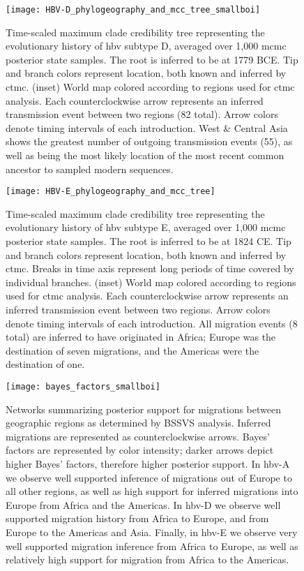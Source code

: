 \begin{figure}[ht]
  \centering
  \medskip
  \texttt{[image: HBV-D\_phylogeography\_and\_mcc\_tree\_smallboi]}
  \caption[HBV-D Phylogeography]{Time-scaled maximum clade credibility tree representing the evolutionary history of \gls{hbv} subtype D, averaged over 1,000 \gls{mcmc} posterior state samples. The root is inferred to be at 1779 BCE. Tip and branch colors represent location, both known and inferred by \gls{ctmc}. (inset) World map colored according to regions used for \gls{ctmc} analysis. Each counterclockwise arrow represents an inferred transmission event between two regions (82 total). Arrow colors denote timing intervals of each introduction. West \& Central Asia shows the greatest number of outgoing transmission events (55), as well as being the most likely location of the most recent common ancestor to sampled modern sequences.}
  \label{fig:HBV-D_phylogeo}
\end{figure}

\begin{figure}[ht]
  \centering
  \medskip
  \texttt{[image: HBV-E\_phylogeography\_and\_mcc\_tree]}
  \caption[HBV-E Phylogeography]{Time-scaled maximum clade credibility tree representing the evolutionary history of \gls{hbv} subtype E, averaged over 1,000 \gls{mcmc} posterior state samples. The root is inferred to be at 1824 CE. Tip and branch colors represent location, both known and inferred by \gls{ctmc}. Breaks in time axis represent long periods of time covered by individual branches. (inset) World map colored according to regions used for \gls{ctmc} analysis. Each counterclockwise arrow represents an inferred transmission event between two regions. Arrow colors denote timing intervals of each introduction. All migration events (8 total) are inferred to have originated in Africa; Europe was the destination of seven migrations, and the Americas were the destination of one.}
  \label{fig:HBV-E_phylogeo}
\end{figure}

\begin{figure}[ht]
  \centering
  \medskip
  \texttt{[image: bayes\_factors\_smallboi]}
  \caption[Bayes' factors of \gls{hbv} geographic transitions]{Networks summarizing posterior support for migrations between geographic regions as determined by BSSVS analysis. Inferred migrations are represented as counterclockwise arrows. Bayes' factors are represented by color intensity; darker arrows depict higher Bayes' factors, therefore higher posterior support. In \gls{hbv}-A we observe well supported inference of migrations out of Europe to all other regions, as well as high support for inferred migrations into Europe from Africa and the Americas. In \gls{hbv}-D we observe well supported migration history from Africa to Europe, and from Europe to the Americas and Asia. Finally, in \gls{hbv}-E we observe very well supported migration inference from Africa to Europe, as well as relatively high support for migration from Africa to the Americas.}
  \label{fig:bayes_factors}
\end{figure}

